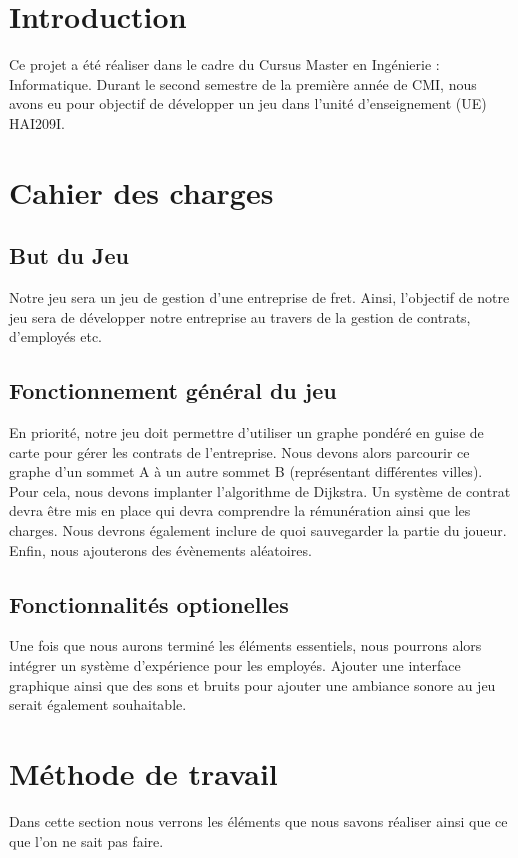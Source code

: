 \documentclass[a4paper, 12pt]{article}
\begin{document}
\newpage


\renewcommand*\contentsname{Sommaire}
\tableofcontents
\newpage
   \section*{Introduction}
      Ce projet a été réaliser dans le cadre du Cursus Master en Ingénierie : Informatique. Durant le second semestre de la première année de CMI, nous avons eu pour objectif de développer un jeu dans l'unité d'enseignement (UE) HAI209I. 
      
      \newline
\section{Cahier des charges}
      \subsection{But du Jeu}
         Notre jeu sera un jeu de gestion d'une entreprise de fret. Ainsi, l'objectif de notre jeu sera de développer notre entreprise au travers de la gestion de contrats, d'employés etc. 
      \subsection{Fonctionnement général du jeu}
        En priorité, notre jeu doit permettre d'utiliser un graphe pondéré en guise de carte pour gérer les contrats de l'entreprise. Nous devons alors parcourir ce graphe d'un sommet A à un autre sommet B (représentant différentes villes). Pour cela, nous devons implanter l'algorithme de Dijkstra. Un système de contrat devra être mis en place qui devra comprendre la rémunération ainsi que les charges. Nous devrons également inclure de quoi sauvegarder la partie du joueur. Enfin, nous ajouterons des évènements aléatoires.
      \subsection{Fonctionnalités optionelles}
       Une fois que nous aurons terminé les éléments essentiels, nous pourrons alors intégrer un système d'expérience pour les employés. Ajouter une interface graphique ainsi que des sons et bruits pour ajouter une ambiance sonore au jeu serait également souhaitable.
\newpage
\section{Méthode de travail}
     Dans cette section nous verrons les éléments que nous savons réaliser ainsi que ce que l'on ne sait pas faire.
\end{document}
